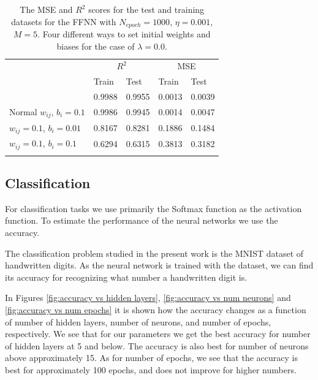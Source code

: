 \documentclass{emulateapj}
\begin{document}
\begin{table}[!htb]
\begin{center}
\caption{The MSE and $R^2$ scores for the test and training datasets for the FFNN with $N_{epoch}=1000$, $\eta=0.001$, $M=5$. Four different ways to set initial weights and biases for the case of $\lambda=0.0$.}
\label{tab:bias and weight FFNN}  
\begin{tabular}{lllll}
\cline{2-5}
\noalign{\smallskip}
\cline{2-5}\noalign{\smallskip}
& \multicolumn{2}{c}{$R^2$} & \multicolumn{2}{c}{MSE}\\
\cline{2-5}\noalign{\smallskip} & Train &  Test  & Train & Test \\
\hline\noalign{\smallskip}
\multicolumn{1}{l|}{Normal $w_{ij}$, $b_i=0.01$} & 0.9988 & 0.9955 & 0.0013 & 0.0039 \\
\multicolumn{1}{l|}{Normal $w_{ij}$, $b_i=0.1$} & 0.9986 & 0.9945 & 0.0014 & 0.0047 \\
\multicolumn{1}{l|}{$w_{ij}=0.1$, $b_i=0.01$} & 0.8167 & 0.8281 & 0.1886 &  0.1484\\
\multicolumn{1}{l|}{$w_{ij}=0.1$, $b_i=0.1$} & 0.6294 & 0.6315 & 0.3813 & 0.3182 \\\noalign{\smallskip}\hline
\end{tabular}
\end{center}
\end{table}

\subsection{Classification}
\label{sec:classification}

For classification tasks we use primarily the Softmax function as the activation function. To estimate the performance of the neural networks we use the accuracy. 

The classification problem studied in the present work is the MNIST dataset of handwritten digits. As the neural network is trained with the dataset, we can find its accuracy for recognizing what number a handwritten digit is. 

In Figures \ref{fig:accuracy vs hidden layers}, \ref{fig:accuracy vs num neurons} and \ref{fig:accuracy vs num epochs} it is shown how the accuracy changes as a function of number of hidden layers, number of neurons, and number of epochs, respectively. We see that for our parameters we get the best accuracy for number of hidden layers at 5 and below. The accuracy is also best for number of neurons above approximately 15. As for number of epochs, we see that the accuracy is best for approximately 100 epochs, and does not improve for higher numbers. 
\end{document}
